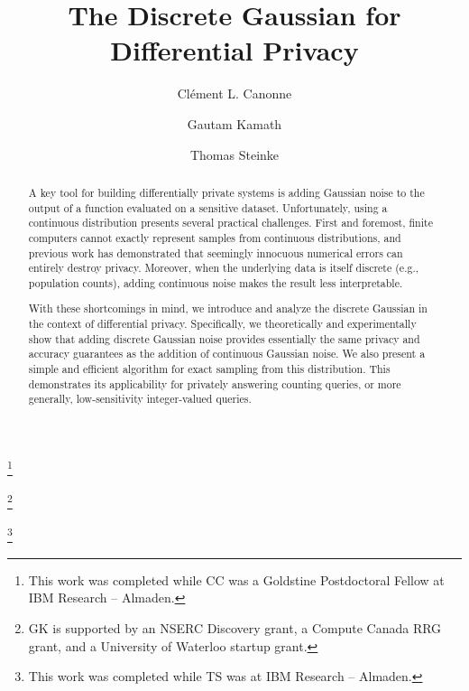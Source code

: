 \documentclass{jpc}
\begin{document}
\title{The Discrete Gaussian for Differential Privacy\rsuper*}

\author[C.~Canonne]{Cl\'ement L. Canonne}	\address{School of Computer Science, University of Sydney}	  \thanks{This work was completed while CC was a Goldstine Postdoctoral Fellow at IBM Research -- Almaden.}	

\author[G.~Kamath]{Gautam Kamath}	\address{Cheriton School of Computer Science, University of Waterloo}	  \thanks{GK is supported by an NSERC Discovery grant,
a Compute Canada RRG grant, and a University of Waterloo startup grant.}	

\author[T.~Steinke]{Thomas Steinke}	\address{Google Research, Brain Team}	
\thanks{This work was completed while TS was at IBM Research -- Almaden.}	









\begin{abstract}
  \noindent A key tool for building differentially private systems is adding Gaussian noise to the output of a function evaluated on a sensitive dataset. Unfortunately, using a continuous distribution presents several practical challenges.
First and foremost, finite computers cannot exactly represent samples from continuous distributions, and previous work has demonstrated that seemingly innocuous numerical errors can entirely destroy privacy. Moreover, when the underlying data is itself discrete (e.g., population counts), adding continuous noise makes the result less interpretable.

With these shortcomings in mind, we introduce and analyze the discrete Gaussian in the context of differential privacy. Specifically, we theoretically and experimentally show that adding discrete Gaussian noise provides essentially the same privacy and accuracy guarantees as the addition of continuous Gaussian noise. We also present a simple and efficient algorithm for exact sampling from this distribution. This demonstrates its applicability for privately answering counting queries, or more generally, low-sensitivity integer-valued queries.
\end{abstract}
\end{document}
